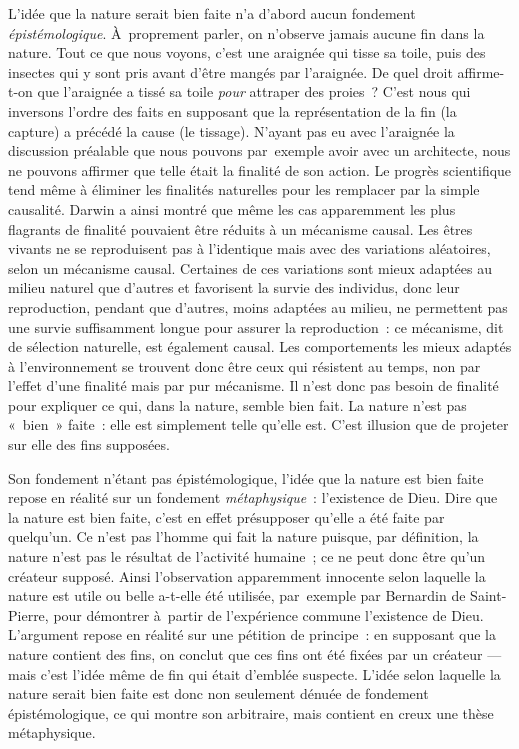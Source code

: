 \documentclass[a4paper,12pt]{report}
\begin{document}
L'idée que la nature serait bien faite n'a d'abord aucun fondement
\emph{épistémologique}​. À proprement parler, on
n'observe jamais aucune fin dans la nature. Tout ce que nous
voyons, c'est une araignée qui tisse sa toile, puis
des insectes qui y sont pris avant d'être mangés par l'araignée. De quel
droit affirme-t-on que l'araignée a tissé sa toile \emph{pour} attraper des
proies ? C'est nous qui inversons l'ordre des faits en supposant que la
représentation de la fin (la capture) a précédé la cause (le tissage).
N'ayant pas eu avec l'araignée la discussion préalable que nous pouvons
par exemple avoir avec un architecte, nous ne pouvons affirmer que telle
était la finalité de son action. Le progrès scientifique tend même à
éliminer les finalités naturelles pour les remplacer par la simple
causalité. Darwin a ainsi montré que même les cas
apparemment les plus flagrants de finalité pouvaient être réduits à un
mécanisme causal. Les êtres vivants ne se reproduisent pas à l'identique
mais avec des variations aléatoires, selon un mécanisme causal.
Certaines de ces variations sont mieux adaptées au milieu naturel que
d'autres et favorisent la survie des individus, donc leur reproduction,
pendant que d'autres, moins adaptées au milieu, ne permettent pas une
survie suffisamment longue pour assurer la reproduction : ce mécanisme,
dit de sélection naturelle, est également causal. Les comportements les
mieux adaptés à l'environnement se trouvent donc être ceux qui résistent
au temps, non par l'effet d'une finalité mais par pur mécanisme. Il
n'est donc pas besoin de finalité pour expliquer ce qui, dans la nature,
semble bien fait. La nature n'est pas
« bien » faite : elle est simplement telle qu'elle est. C'est illusion
que de projeter sur elle des fins supposées.

Son fondement n'étant pas épistémologique, l'idée
que la nature est bien faite repose en réalité sur un fondement
\emph{métaphysique}​ : l'existence de Dieu. Dire que la nature est bien faite,
c'est en effet présupposer qu'elle a été faite par quelqu'un. Ce n'est
pas l'homme qui fait la nature puisque, par définition, la nature n'est
pas le résultat de l'activité humaine ; ce ne peut donc être qu'un
créateur supposé. Ainsi l'observation apparemment
innocente selon laquelle la nature est utile ou belle a-t-elle été
utilisée, par exemple par Bernardin de Saint-Pierre, pour démontrer
à partir de l'expérience commune l'existence de Dieu. L'argument repose
en réalité sur une pétition de principe : en supposant que la nature
contient des fins, on conclut que ces fins ont été fixées par un
créateur — mais c'est l'idée même de fin qui était d'emblée suspecte.
L'idée selon laquelle la nature serait bien
faite est donc non seulement dénuée de fondement épistémologique, ce qui
montre son arbitraire, mais contient en creux une thèse métaphysique.
\end{document}
